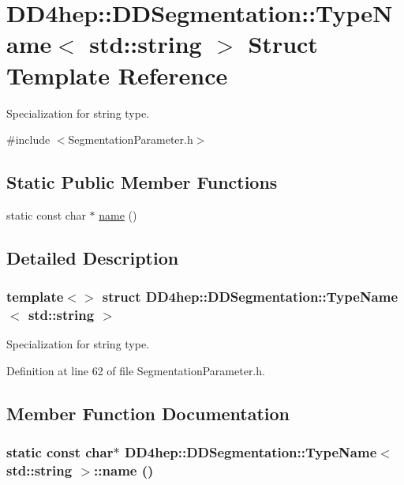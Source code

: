 \hypertarget{struct_d_d4hep_1_1_d_d_segmentation_1_1_type_name_3_01std_1_1string_01_4}{
\section{DD4hep::DDSegmentation::TypeName$<$ std::string $>$ Struct Template Reference}
\label{struct_d_d4hep_1_1_d_d_segmentation_1_1_type_name_3_01std_1_1string_01_4}
}


Specialization for string type.  


{\ttfamily \#include $<$SegmentationParameter.h$>$}\subsection*{Static Public Member Functions}
\begin{DoxyCompactItemize}
\item 
static const char $\ast$ \hyperlink{struct_d_d4hep_1_1_d_d_segmentation_1_1_type_name_3_01std_1_1string_01_4_a3fb72c60bd5cfe7edc0342a572acde8b}{name} ()
\end{DoxyCompactItemize}


\subsection{Detailed Description}
\subsubsection*{template$<$$>$ struct DD4hep::DDSegmentation::TypeName$<$ std::string $>$}

Specialization for string type. 

Definition at line 62 of file SegmentationParameter.h.

\subsection{Member Function Documentation}
\hypertarget{struct_d_d4hep_1_1_d_d_segmentation_1_1_type_name_3_01std_1_1string_01_4_a3fb72c60bd5cfe7edc0342a572acde8b}{
\subsubsection[{name}]{\setlength{\rightskip}{0pt plus 5cm}static const char$\ast$ {\bf DD4hep::DDSegmentation::TypeName}$<$ std::string $>$::name ()}}
\label{struct_d_d4hep_1_1_d_d_segmentation_1_1_type_name_3_01std_1_1string_01_4_a3fb72c60bd5cfe7edc0342a572acde8b}


